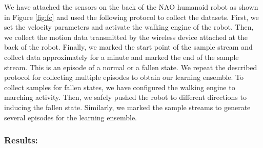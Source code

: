 \documentclass[letterpaper]{article}
\begin{document}
\begin{sloppy}
We have attached the sensors on the back of the NAO humanoid robot as shown in Figure \ref{fig:fc} 
and used the following protocol to collect the datasets. First, we set the velocity 
parameters and activate the walking engine of the robot. Then, we collect the motion data 
transmitted by the wireless device attached at the back of the robot. Finally, we marked the start 
point of the sample stream and collect data approximately for a minute and marked the end of the 
sample stream. This is an episode of a normal  or a fallen state. We repeat the described 
protocol for collecting multiple episodes to obtain our learning ensemble. To collect samples for 
fallen states, we have configured the walking engine to marching activity. Then, we safely pushed 
the robot to different directions to inducing the fallen state. Similarly, we marked the sample 
streams to generate several episodes for the learning ensemble.    
%


\subsubsection{Results:}


\end{sloppy}
\end{document}
